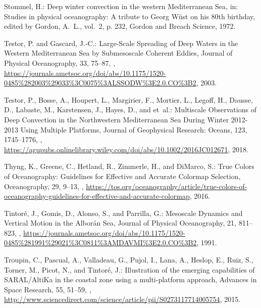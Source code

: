 \documentclass[essd]{copernicus}
\begin{document}
\begin{thebibliography}{46}
Stommel, H.: {Deep winter convection in the western Mediterranean Sea}, in:
  {Studies in physical oceanography: A tribute to Georg W\"{u}st on his 80th
  birthday}, edited by Gordon, A.~L., vol.~2, p. 232, Gordon and Breach
  Science, 1972.

Testor, P. and Gascard, J.-C.: Large-Scale Spreading of Deep Waters in the
  Western Mediterranean Sea by Submesoscale Coherent Eddies, Journal of
  Physical Oceanography, 33, 75--87,
  ,
  \urlprefix\url{https://journals.ametsoc.org/doi/abs/10.1175/1520-0485%282003%29033%3C0075%3ALSSODW%3E2.0.CO%3B2},
  2003.

Testor, P., Bosse, A., Houpert, L., Margirier, F., Mortier, L., Legoff, H.,
  Dausse, D., Labaste, M., Karstensen, J., Hayes, D., and et~al.: {Multiscale
  Observations of Deep Convection in the Northwestern Mediterranean Sea During
  Winter 2012-2013 Using Multiple Platforms}, Journal of Geophysical Research:
  Oceans, 123, 1745–1776, ,
  \urlprefix\url{https://agupubs.onlinelibrary.wiley.com/doi/abs/10.1002/2016JC012671},
  2018.

Thyng, K., Greene, C., Hetland, R., Zimmerle, H., and DiMarco, S.: True Colors
  of Oceanography: Guidelines for Effective and Accurate Colormap Selection,
  {Oceanography}, 29, 9--13, ,
  \urlprefix\url{https://tos.org/oceanography/article/true-colors-of-oceanography-guidelines-for-effective-and-accurate-colormap},
  2016.

Tintor\'{e}, J., Gomis, D., Alonso, S., and Parrilla, G.: {Mesoscale Dynamics
  and Vertical Motion in the Albor\'{a}n Sea}, Journal of Physical
  Oceanography, 21, 811–823,
  ,
  \urlprefix\url{https://journals.ametsoc.org/doi/abs/10.1175/1520-0485%281991%29021%3C0811%3AMDAVMI%3E2.0.CO%3B2},
  1991.

Troupin, C., Pascual, A., Valladeau, G., Pujol, I., Lana, A., Heslop, E., Ruiz,
  S., Torner, M., Picot, N., and Tintor\'{e}, J.: {Illustration of the emerging
  capabilities of SARAL/AltiKa in the coastal zone using a multi-platform
  approach}, Advances in Space Research, 55, 51--59,
  ,
  \urlprefix\url{http://www.sciencedirect.com/science/article/pii/S0273117714005754},
  2015.


\end{thebibliography}
\end{document}
